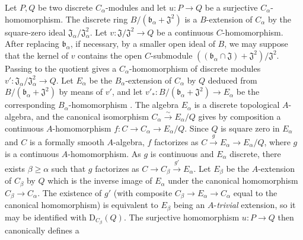 \begin{env}[19.5.6.1]
\label{0.19.5.6.1}
Let $P,Q$ be two discrete $C_\alpha$-modules and let
$u:P\to Q$ be a surjective $C_\alpha$-homomorphism.
The discrete ring $B/(\mathfrak{b}_\alpha+\mathfrak{J}^2)$ is a $B$-extension of $C_\alpha$ by the square-zero ideal
$\mathfrak{J}_\alpha/\mathfrak{J}_\alpha^2$.
Let $v:\mathfrak{J}/\mathfrak{J}^2\to Q$ be a continuous $C$-homomorphism.
After replacing $\mathfrak{b}_\alpha$, if necessary, by a smaller open ideal of $B$, we may suppose that the kernel of $v$ contains the open $C$-submodule
$((\mathfrak{b}_\alpha\cap\mathfrak{J})+\mathfrak{J}^2)/\mathfrak{J}^2$.
Passing to the quotient gives a $C_\alpha$-homomorphism of discrete modules
$v':\mathfrak{J}_\alpha/\mathfrak{J}_\alpha^2\to Q$.
Let $E_\alpha$ be the $B_\alpha$-extension of $C_\alpha$ by $Q$ deduced from
$B/(\mathfrak{b}_\alpha+\mathfrak{J}^2)$ by means of $v'$, and let
$v'_*:B/(\mathfrak{b}_\alpha+\mathfrak{J}^2)\to E_\alpha$
be the corresponding $B_\alpha$-homomorphism .
The algebra $E_\alpha$ is a discrete topological $A$-algebra, and the canonical isomorphism
$C_\alpha\xrightarrow{\sim}E_\alpha/Q$ gives by composition a continuous
$A$-homomorphism $f:C\to C_\alpha\to E_\alpha/Q$.
Since $Q$ is square zero in $E_\alpha$ and $C$ is a formally smooth $A$-algebra,
$f$ factorizes as
$C\xrightarrow{g}E_\alpha\to E_\alpha/Q$, where $g$ is a continuous
$A$-homomorphism.
As $g$ is continuous and $E_\alpha$ discrete, there exists $\beta\geq\alpha$
such that $g$ factorizes as
$C\to C_\beta\xrightarrow{g'}E_\alpha$.
Let $E_\beta$ be the $A$-extension of $C_\beta$ by $Q$ which is the inverse image
of $E_\alpha$ under the canonical homomorphism $C_\beta\to C_\alpha$.
The existence of $g'$ (with composite $C_\beta\to E_\alpha\to C_\alpha$ equal
to the canonical homomorphism) is equivalent to $E_\beta$ being an
$A$-\emph{trivial} extension, so it may be identified with
$\mathrm{D}_{C_\beta}(Q)$.
The surjective homomorphism $u:P\to Q$ then canonically defines a



\end{env}
